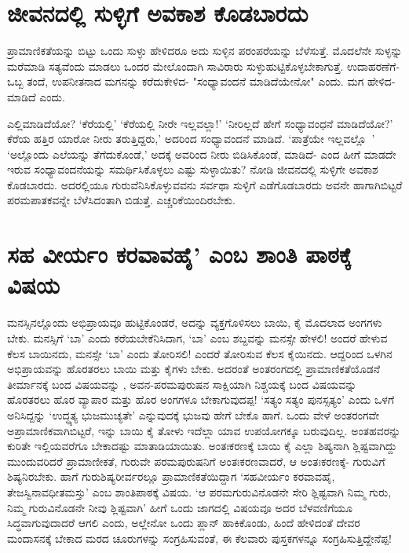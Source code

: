 \section*{ಜೀವನದಲ್ಲಿ ಸುಳ್ಳಿಗೆ ಅವಕಾಶ ಕೊಡಬಾರದು}

ಪ್ರಾಮಾಣಿಕತೆಯನ್ನು ಬಿಟ್ಟು ಒಂದು ಸುಳ್ಳು ಹೇಳಿದರೂ ಅದು ಸುಳ್ಳಿನ ಪರಂಪರೆಯನ್ನು ಬೆಳೆಸುತ್ತೆ. ಮೊದಲೆನೇ ಸುಳ್ಳನ್ನು ಮರೆಮಾಡಿ ಸತ್ಯವೆಂದು ಮಾಡಲು ಒಂದರ ಮೇಲೊಂದಾಗಿ ಸಾವಿರಾರು ಸುಳ್ಳುಹುಟ್ಟಿಕೊಳ್ಳಬೇಕಾಗುತ್ತೆ. ಉದಾಹರಣೆಗೆ- ಒಬ್ಬ ತಂದೆ, ಉಪನೀತನಾದ ಮಗನನ್ನು ಕರೆದುಕೇಳಿದ- "ಸಂಧ್ಯಾವಂದನೆ ಮಾಡಿದೆಯೇನೋ" ಎಂದು. ಮಗ ಹೇಳಿದ- ಮಾಡಿದೆ ಎಂದು. 

ಎಲ್ಲಿಮಾಡಿದೆಯೋ? `ಕೆರೆಯಲ್ಲಿ' `ಕೆರೆಯಲ್ಲಿ ನೀರೇ ಇಲ್ಲವಲ್ಲಾ!' `ನೀರಿಲ್ಲದೆ ಹೇಗೆ ಸಂಧ್ಯಾವಂಧನೆ ಮಾಡಿದೆಯೋ?' ಕೆರೆಯ ಹತ್ತಿರ ಯಾರೋ ನೀರು ತರುತ್ತಿದ್ದರು,' ಅದರಿಂದ ಸಂಧ್ಯಾವಂದನೆ ಮಾಡಿದೆ. `ಪಾತ್ರೆಯೇ ಇಲ್ಲವಲ್ಲೊ~' `ಅಲ್ಲೊಂದು ಎಲೆಯನ್ನು ತೆಗೆದುಕೊಂಡೆ,' ಅದಕ್ಕೆ ಅವರಿಂದ ನೀರು ಬಿಡಿಸಿಕೊಂಡೆ, ಮಾಡಿದೆ- ಎಂದ ಹೀಗೆ ಮಾಡದೇ ಇರುವ ಸಂಧ್ಯಾವಂದನೆಯನ್ನು ಸಮರ್ಥಿಸಿಕೊಳ್ಳಲು ಎಷ್ಟು ಸುಳ್ಳಾಯಿತು? ನೋಡಿ ಜೀವನದಲ್ಲಿ ಸುಳ್ಳಿಗೇ ಅವಕಾಶ ಕೊಡಬಾರದು. ಅದರಲ್ಲಿಯೂ ಗುರುವೆನಿಸಿಕೊಳ್ಳುವವನು ಸರ್ವಥಾ ಸುಳ್ಳಿಗೆ ಎಡೆಗೊಡಬಾರದು ಅವನೇ ಹಾಗಾಗಿಬಿಟ್ಟರೆ ಪರಮಪಾತಕವನ್ನೇ ಬೆಳೆಸಿದಂತಾಗಿ ಬಿಡುತ್ತೆ. ಎಚ್ಚರಿಕೆಯಿಂದಿರಬೇಕು.

\section*{ಸಹ ವೀರ್ಯಂ ಕರವಾವಹೈ' ಎಂಬ ಶಾಂತಿ ಪಾಠಕ್ಕೆ ವಿಷಯ}

ಮನಸ್ಸಿನಲ್ಲೊಂದು ಅಭಿಪ್ರಾಯವೂ ಹುಟ್ಟಿಕೊಂಡರೆ, ಅದನ್ನು ವ್ಯಕ್ತಗೊಳಿಸಲು ಬಾಯಿ, ಕೈ ಮೊದಲಾದ ಅಂಗಗಳು ಬೇಕು. ಮನಸ್ಸಿಗೆ `ಬಾ' ಎಂದು ಕರೆಯಬೇಕೆನಿಸಿದಾಗ, `ಬಾ' ಎಂಬ ಶಬ್ದವನ್ನು ಮನಸ್ಸೇ ಹೇಳಲಿ! ಅಂದರೆ ಹೇಳುವ ಕೆಲಸ ಬಾಯಿನದು, ಮನಸ್ಸೇ `ಬಾ' ಎಂದು ತೋರಿಸಲಿ! ಎಂದರೆ ತೋರಿಸುವ ಕೆಲಸ ಕೈಯಿನದು. ಆದ್ದರಿಂದ ಒಳಗಿನ ಅಭಿಪ್ರಾಯವನ್ನು ಹೊರತರಲು ಬಾಯಿ ಮತ್ತು ಕೈಗಳು ಬೇಕು. ಅದರಂತೆ ಅಂತರಂಗದಲ್ಲಿ ಪ್ರಾಮಾಣಿಕತೆಯೊಡನೆ ತೀರ್ಮಾನಕ್ಕೆ ಬಂದ ವಿಷಯವನ್ನು , ಅವನ-ಪರಮಪುರುಷನ ಸಾಕ್ಷಿಯಾಗಿ ನಿಶ್ಚಯಕ್ಕೆ ಬಂದ ವಿಷಯವನ್ನು ಹೊರತರಲು ಹೊರ ವ್ಯಾಪಾರ ಮತ್ತು ಹೊರ ಅಂಗಗಳೂ ಬೇಕಾಗುವುದಪ್ಪ! `ಸತ್ಯಂ ಸತ್ಯಂ ಪುನಸ್ಸತ್ಯಂ' ಎಂದು ಒಳಗೆ ಅನಿಸಿದ್ದನ್ನು `ಉದ್ಧ್ಯತ್ಯ ಭುಜಮುಚ್ಯತೇ' ಎನ್ನುವುದಕ್ಕೆ ಭುಜವು ಹೇಗೆ ಬೇಕೊ ಹಾಗೆ. ಒಂದು ವೇಳೆ ಅಂತರಂಗವೇ ಅಪ್ರಾಮಾಣಿಕವಾಗಿಬಿಟ್ಟರೆ, ಇನ್ನು ಬಾಯಿ ಕೈ ತೋಳು ಇದೆಲ್ಲಾ ಯಾವ ಉಪಯೋಗಕ್ಕೂ ಬರುವುದಿಲ್ಲ. ಅಂತಹವರನ್ನು ಕುರಿತೇ ಇಲ್ಲಿಯವರೆಗೂ ಬೇಕಾದಷ್ಟು ಮಾತಾಡಿಯಾಯಿತು. ಅಂತಃಕರಣಕ್ಕೆ ಬಾಯಿ ಕೈ ಎಲ್ಲಾ ಶಿಷ್ಯನಾಗಿ ಶ್ಲಿಷ್ಟವಾಗಿದ್ದು ಮುಂದುವರಿದರೆ ಪ್ರಾಮಾಣೀಕತೆ, ಗುರುವೇ ಪರಮಪುರುಷನಿಗೆ ಅಂತಃಕರಣವಾದರೆ, ಆ ಅಂತಃಕರಣಕ್ಕೆ- ಗುರುವಿಗೆ ಶಿಷ್ಯನಿರಬೇಕು. ಹಾಗೆ ಗುರುಶಿಷ್ಯರೀರ್ವರಲ್ಲೂ ಪ್ರಾಮಾಣಿಕತೆಯಿದ್ದಾಗ `ಸಹವೀರ್ಯಂ ಕರವಾವಹೈ, ತೇಜಸ್ವಿನಾವಧೀತಮಸ್ತು'  ಎಂಬ ಶಾಂತಿಪಾಠಕ್ಕೆ ವಿಷಯ. `ಆ ಪರಮಗುರುವಿನೊಡನೇ ಸೇರಿ ಶ್ಲಿಷ್ಟವಾಗಿ ನಿಮ್ಮ ಗುರು, ನಿಮ್ಮ ಗುರುವಿನೊಡನೇ ನೀವು ಶ್ಲಿಷ್ಟವಾಗಿ' ಹೀಗೆ ಒಂದು ಜಾಗದಲ್ಲಿ ವಿಷಯವೂ ಅದರ ಬೆಳವಣಿಗೆಯೂ ಸಿದ್ಧವಾಗುವುದಾದರೆ ಆಗಲಿ ಎಂದು, ಅಲ್ಲೇನೋ ಒಂದು ಪ್ಲಾನ್ ಹಾಕಿಕೊಂಡು, ಹಿಂದೆ ಹೇಳಿದಂತೆ ದೇವರ ಮಂದಾಸನಕ್ಕೆ ಬೇಕಾದ ಮರದ ಚೂರುಗಳನ್ನು ಸಂಗ್ರಹಿಸುವಂತೆ, ಈ ಕೆಲವಾರು ಪುಸ್ತಕಗಳನ್ನೂ ಸಂಗ್ರಹಿಸುತ್ತಿದ್ದೇನೆಪ್ಪ!

